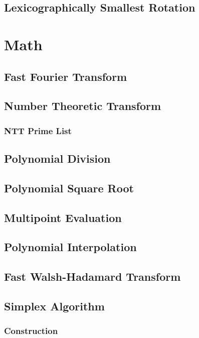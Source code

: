 \documentclass[a4paper,10pt,twocolumn,oneside]{article}
\begin{document}
\subsection{Lexicographically Smallest Rotation}

\section{Math}
\subsection{Fast Fourier Transform}

\subsection{Number Theoretic Transform}

\subsubsection{NTT Prime List}

\subsection{Polynomial Division}

\subsection{Polynomial Square Root}

\subsection{Multipoint Evaluation}

\subsection{Polynomial Interpolation}

\subsection{Fast Walsh-Hadamard Transform}
% 

\subsection{Simplex Algorithm}

\subsubsection{Construction}

\end{document}
